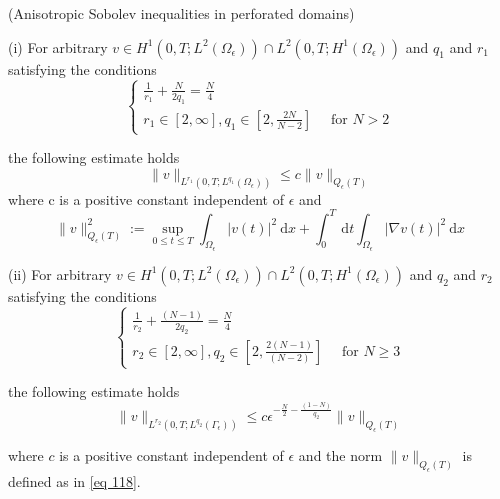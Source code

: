 \begin{lemma} (Anisotropic Sobolev inequalities in perforated domains)

(i) For arbitrary $v \in H^{1}\left(0, T ; L^{2}\left(\Omega_{\epsilon}\right)\right) \cap L^{2}\left(0, T ; H^{1}\left(\Omega_{\epsilon}\right)\right)$ and $q_{1}$ and $r_{1}$ satisfying the conditions
\begin{equation}
  \left\{\begin{array}{l}
\frac{1}{r_{1}}+\frac{N}{2 q_{1}}=\frac{N}{4} \\
r_{1} \in[2, \infty], q_{1} \in\left[2, \frac{2 N}{N-2}\right] \quad \text { for } N>2
\end{array}\right.
\label{eq 116}\end{equation}

the following estimate holds
\begin{equation}
  \|v\|_{L^{r_{1}}\left(0, T ; L^{q_{1}}\left(\Omega_{\epsilon}\right)\right)} \leq c\|v\|_{Q_{\epsilon}(T)}
\label{eq 117}\end{equation}
where $\mathrm{c}$ is a positive constant independent of $\epsilon$ and
\begin{equation}
  \|v\|_{Q_{\epsilon}(T)}^{2}:=\sup _{0 \leq t \leq T} \int_{\Omega_{\epsilon}}|v(t)|^{2} \mathrm{~d} x+\int_{0}^{T} \mathrm{~d} t \int_{\Omega_{\epsilon}}|\nabla v(t)|^{2} \mathrm{~d} x
\label{eq 118}\end{equation}


(ii) For arbitrary $v \in H^{1}\left(0, T ; L^{2}\left(\Omega_{\epsilon}\right)\right) \cap L^{2}\left(0, T ; H^{1}\left(\Omega_{\epsilon}\right)\right)$ and $q_{2}$ and $r_{2}$ satisfying the conditions
\begin{equation}
  \left\{\begin{array}{l}
\frac{1}{r_{2}}+\frac{(N-1)}{2 q_{2}}=\frac{N}{4} \\
r_{2} \in[2, \infty], q_{2} \in\left[2, \frac{2(N-1)}{(N-2)}\right] \quad \text { for } N \geq 3
\end{array}\right.
\label{eq 119}\end{equation}


the following estimate holds
\begin{equation}
  \|v\|_{L^{r_{2}}\left(0, T ; L^{q_{2}}\left(\Gamma_{\epsilon}\right)\right)} \leq c \epsilon^{-\frac{N}{2}-\frac{(1-N)}{q_{2}}}\|v\|_{Q_{\epsilon}(T)}
\label{eq 120}\end{equation}


where $c$ is a positive constant independent of $\epsilon$ and the norm $\|v\|_{Q_{\epsilon}(T)}$ is defined as in \eqref{eq 118}.
\label{lemma 7.3}\end{lemma}
